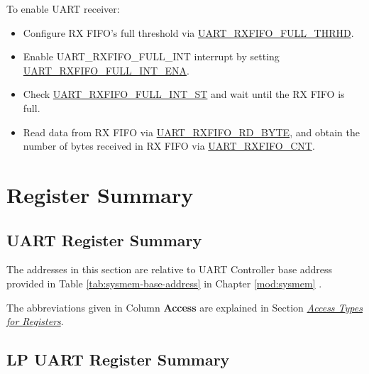 \documentclass[main\_\_EN.tex]{subfiles}
\begin{document}
To enable UART receiver:
\begin{itemize}
    \item Configure RX FIFO's full threshold via \hyperref[fielddesc:UARTRXFIFOFULLTHRHD]{UART\_RXFIFO\_FULL\_THRHD}.
    \item Enable UART\_RXFIFO\_FULL\_INT interrupt by setting \hyperref[fielddesc:UARTRXFIFOFULLINTENA]{UART\_RXFIFO\_FULL\_INT\_ENA}.
    \item Check \hyperref[fielddesc:UARTRXFIFOFULLINTST]{UART\_RXFIFO\_FULL\_INT\_ST} and wait until the RX FIFO is full.
    \item Read data from RX FIFO via  \hyperref[fielddesc:UARTRXFIFORDBYTE]{UART\_RXFIFO\_RD\_BYTE}, and obtain the number of bytes received in RX FIFO via \hyperref[fielddesc:UARTRXFIFOCNT]{UART\_RXFIFO\_CNT}.
\end{itemize}





\clearpage
\section{Register Summary}
\label{sec:uart-reg-summ}
\hypertarget{uart-reg-summ}{}

\subsection{UART Register Summary}

The addresses in this section are relative to UART Controller base address provided in Table \ref{tab:sysmem-base-address} in Chapter \ref{mod:sysmem} \textit{}.

The abbreviations given in Column \textbf{Access} are explained in Section \hyperref[glossary-access-types]{\textit{Access Types for Registers}}.



\subsection{LP UART Register Summary}
\end{document}
